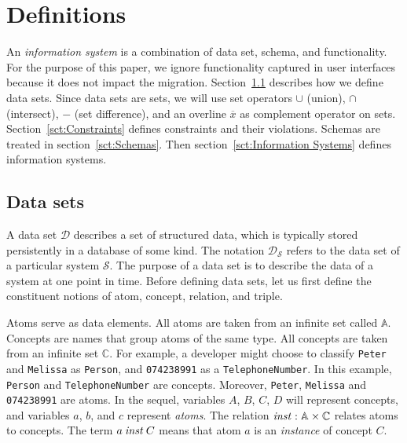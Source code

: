 \documentclass[runningheads]{llncs}
\newcommand{\id}[1]{\text{\it #1\/}}
\newcommand{\instance}{\mathbin{\id{inst}}}
\newcommand{\Pair}[2]{#1\times#2}
\newcommand{\atom}[1]{{\tt\small #1}}
\newcommand{\Atoms}{\mathbb{A}}
\newcommand{\concept}[1]{{\tt\small #1}}
\newcommand{\Concepts}{\mathbb{C}}
\newcommand{\dataset}{\mathscr{D}}
\newcommand{\infsys}{\mathscr{S}}
\newcommand{\cmpl}[1]{\overline{#1}}
\def\define#1{\label{dfn:#1}{\em #1}\index{#1}}
\begin{document}
\section{Definitions}
\label{sct:Definitions}
   An \define{information system} is a combination of data set, schema, and functionality.
   For the purpose of this paper, we ignore functionality captured in user interfaces because it does not impact the migration.
   Section~\ref{sct:Data sets} describes how we define data sets.
   Since data sets are sets, we will use set operators $\cup$ (union), $\cap$ (intersect), $-$ (set difference), and an overline $\cmpl{x}$ as complement operator on sets.
   Section~\ref{sct:Constraints} defines constraints and their violations.
   Schemas are treated in section~\ref{sct:Schemas}.
   Then section~\ref{sct:Information Systems} defines information systems.

\subsection{Data sets}
\label{sct:Data sets}
   A data set $\dataset$ describes a set of structured data, which is typically stored persistently in a database of some kind.
   The notation $\dataset_{\infsys}$ refers to the data set of a particular system $\infsys$.
   The purpose of a data set is to describe the data of a system at one point in time. 
   Before defining data sets, let us first define the constituent notions of atom, concept, relation, and triple.
   
   Atoms serve as data elements.
   All atoms are taken from an infinite set called $\Atoms$.
   Concepts are names that group atoms of the same type.
   All concepts are taken from an infinite set $\Concepts$.
   For example, a developer might choose to classify \atom{Peter} and \atom{Melissa} as \concept{Person},
   and \atom{074238991} as a \concept{TelephoneNumber}.
   In this example, \concept{Person} and \concept{TelephoneNumber} are concepts.
   Moreover, \atom{Peter}, \atom{Melissa} and \atom{074238991} are atoms.
   In the sequel, variables $A$, $B$, $C$, $D$ will represent concepts, and variables $a$, $b$, and $c$ represent \emph{atoms}.
   The relation $\instance:\Pair{\Atoms}{\Concepts}$ relates atoms to concepts.
   The term $a\instance C$ means that atom $a$ is an \emph{instance} of concept $C$.
\end{document}
